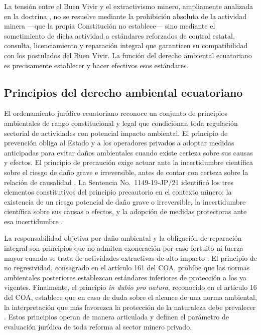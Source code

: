La tensión entre el Buen Vivir y el extractivismo minero, ampliamente analizada en la doctrina \parencite{grefa_valencia_2021}, no se resuelve mediante la prohibición absoluta de la actividad minera ---que la propia Constitución no establece--- sino mediante el sometimiento de dicha actividad a estándares reforzados de control estatal, consulta, licenciamiento y reparación integral que garanticen su compatibilidad con los postulados del Buen Vivir. La función del derecho ambiental ecuatoriano es precisamente establecer y hacer efectivos esos estándares.

\subsection{Principios del derecho ambiental ecuatoriano}

El ordenamiento jurídico ecuatoriano reconoce un conjunto de principios ambientales de rango constitucional y legal que condicionan toda regulación sectorial de actividades con potencial impacto ambiental. El principio de prevención obliga al Estado y a los operadores privados a adoptar medidas anticipadas para evitar daños ambientales cuando existe certeza sobre sus causas y efectos. El principio de precaución exige actuar ante la incertidumbre científica sobre el riesgo de daño grave e irreversible, antes de contar con certeza sobre la relación de causalidad \parencite{coa_2017}. La Sentencia No.\ 1149-19-JP/21 identificó los tres elementos constitutivos del principio precautorio en el contexto minero: la existencia de un riesgo potencial de daño grave o irreversible, la incertidumbre científica sobre sus causas o efectos, y la adopción de medidas protectoras ante esa incertidumbre \parencite{cce_1149_19_jp_21}.

La responsabilidad objetiva por daño ambiental y la obligación de reparación integral son principios que no admiten exoneración por caso fortuito ni fuerza mayor cuando se trata de actividades extractivas de alto impacto \parencite{coa_2017}. El principio de no regresividad, consagrado en el artículo 161 del COA, prohíbe que las normas ambientales posteriores establezcan estándares inferiores de protección a los ya vigentes. Finalmente, el principio \textit{in dubio pro natura}, reconocido en el artículo 16 del COA, establece que en caso de duda sobre el alcance de una norma ambiental, la interpretación que más favorezca la protección de la naturaleza debe prevalecer \parencite{cce_1149_19_jp_21,sanchez_romero_et_al_2026}. Estos principios operan de manera articulada y definen el parámetro de evaluación jurídica de toda reforma al sector minero privado.

